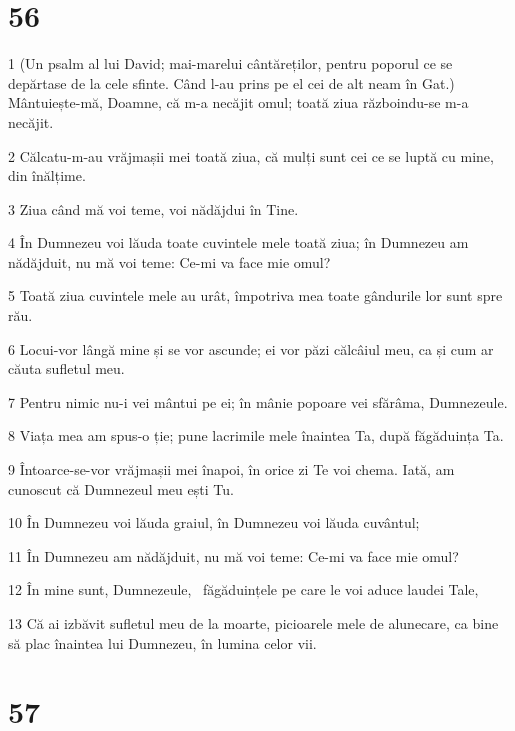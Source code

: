\chapter{56}

\par 1 (Un psalm al lui David; mai-marelui cântăreților, pentru poporul ce se depărtase de la cele sfinte. Când l-au prins pe el cei de alt neam în Gat.) Mântuiește-mă, Doamne, că m-a necăjit omul; toată ziua războindu-se m-a necăjit.
\par 2 Călcatu-m-au vrăjmașii mei toată ziua, că mulți sunt cei ce se luptă cu mine, din înălțime.
\par 3 Ziua când mă voi teme, voi nădăjdui în Tine.
\par 4 În Dumnezeu voi lăuda toate cuvintele mele toată ziua; în Dumnezeu am nădăjduit, nu mă voi teme: Ce-mi va face mie omul?
\par 5 Toată ziua cuvintele mele au urât, împotriva mea toate gândurile lor sunt spre rău.
\par 6 Locui-vor lângă mine și se vor ascunde; ei vor păzi călcâiul meu, ca și cum ar căuta sufletul meu.
\par 7 Pentru nimic nu-i vei mântui pe ei; în mânie popoare vei sfărâma, Dumnezeule.
\par 8 Viața mea am spus-o ție; pune lacrimile mele înaintea Ta, după făgăduința Ta.
\par 9 Întoarce-se-vor vrăjmașii mei înapoi, în orice zi Te voi chema. Iată, am cunoscut că Dumnezeul meu ești Tu.
\par 10 În Dumnezeu voi lăuda graiul, în Dumnezeu voi lăuda cuvântul;
\par 11 În Dumnezeu am nădăjduit, nu mă voi teme: Ce-mi va face mie omul?
\par 12 În mine sunt, Dumnezeule,  făgăduințele pe care le voi aduce laudei Tale,
\par 13 Că ai izbăvit sufletul meu de la moarte, picioarele mele de alunecare, ca bine să plac înaintea lui Dumnezeu, în lumina celor vii.

\chapter{57}

